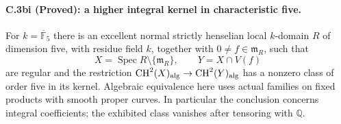 \paragraph{C.3bi (Proved): a higher integral kernel in characteristic five.}
For $k=\overline{\mathbb F}_5$ there is an
excellent normal strictly henselian local $k$-domain $R$ of dimension five,
with residue field $k$, together with $0\ne f\in\mathfrak m_R$, such that
\[
 X=\operatorname{Spec}R\setminus\{\mathfrak m_R\},\qquad
 Y=X\cap V(f)
\]
are regular and the restriction
$\mathrm{CH}^2(X)_{\rm alg}\to\mathrm{CH}^2(Y)_{\rm alg}$ has a nonzero
class of order five in its kernel. Algebraic equivalence here uses actual
families on fixed products with smooth proper curves. In particular the
conclusion concerns integral coefficients; the exhibited class vanishes
after tensoring with $\mathbb Q$.

